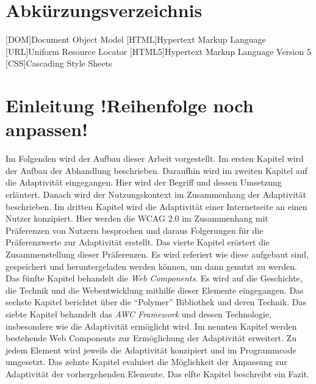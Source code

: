 \documentclass[12pt, paper=a4, bibtotoc, toc=listof, headsepline=true]{scrreprt}
\begin{document}
\chapter*{Abkürzungsverzeichnis}
\begin{acronym}
	[DOM]{Document Object Model}
	[HTML]{Hypertext Markup Language}
	[URL]{Uniform Resource Locator}
	[HTML5]{Hypertext Markup Language Version 5}
	[CSS]{Cascading Style Sheets}
\end{acronym}

\tableofcontents



\chapter{Einleitung !Reihenfolge noch anpassen!}
Im Folgenden wird der Aufbau dieser Arbeit vorgestellt. Im ersten Kapitel wird der Aufbau der Abhandlung beschrieben. Daraufhin wird im zweiten Kapitel auf die Adaptivität eingegangen. Hier wird der Begriff und dessen Umsetzung erläutert. Danach wird der Nutzungskontext im Zusammenhang der Adaptivität beschrieben. Im dritten Kapitel wird die Adaptivität einer Internetseite an einen Nutzer konzipiert. Hier werden die \ac{WCAG 2.0} im Zusammenhang mit Präferenzen von Nutzern besprochen und daraus Folgerungen für die Präferenzwerte zur Adaptivität erstellt. Das vierte Kapitel erörtert die Zusammenstellung dieser Präferenzen. Es wird referiert wie diese aufgebaut sind, gespeichert und heruntergeladen werden können, um dann genutzt zu werden. Das fünfte Kapitel behandelt die \emph{Web Components}. Es wird auf die Geschichte, die Technik und die Webentwicklung mithilfe dieser Elemente eingegangen. Das sechste Kapitel berichtet über die \enquote{Polymer} Bibliothek und deren Technik. Das siebte Kapitel behandelt das \emph{AWC Framework} und dessen Technologie, insbesondere wie die Adaptivität ermöglicht wird. Im neunten Kapitel werden bestehende Web Components zur Ermöglichung der Adaptivität erweitert. Zu jedem Element wird jeweils die Adaptivität konzipiert und im Programmcode umgesetzt. Das zehnte Kapitel evaluiert die Möglichkeit der Anpassung zur Adaptivität der vorhergehenden Elemente. Das elfte Kapitel beschreibt ein Fazit. 
\end{document}

